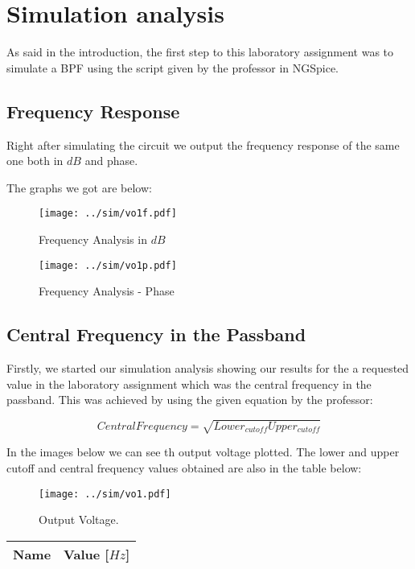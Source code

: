 \section{Simulation analysis}
\label{sec:simulation}
As said in the introduction, the first step to this laboratory assignment was to simulate a BPF using the script given by the professor in NGSpice.

\subsection{Frequency Response}
Right after simulating the circuit we output the frequency response of the same one both in $dB$ and phase. \par
The graphs we got are below: \par

\begin{figure}[H] \centering
\texttt{[image: ../sim/vo1f.pdf]}
\caption{Frequency Analysis in $dB$}
\label{fig:frequency1}
\end{figure}

\begin{figure}[H] \centering
\texttt{[image: ../sim/vo1p.pdf]}
\caption{Frequency Analysis - Phase}
\label{fig:frequency2}
\end{figure}

\subsection{Central Frequency in the Passband}
Firstly, we started our simulation analysis showing our results for the a requested value in the laboratory assignment which was the central frequency in the passband. This was achieved by using the given equation by the professor: \par
\begin{equation}
    CentralFrequency = \sqrt{Lower_{cutoff} Upper_{cutoff}}
\end{equation}\par
In the images below we can see th output voltage plotted. The lower and upper cutoff and central frequency values obtained are also in the table below:

\begin{figure}[H] \centering
\texttt{[image: ../sim/vo1.pdf]}
\caption{Output Voltage.}
\label{fig:output}
\end{figure}

\begin{table}[H]
  \centering
  \begin{tabular}{|l|r|}
    \hline    
    {\bf Name} & {\bf Value [$Hz$]} \\ \hline
    
  \end{tabular}
  \label{tab:central}
\end{table}


